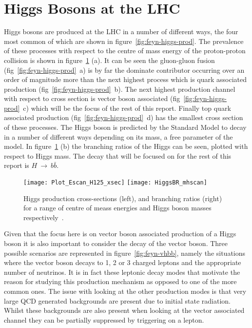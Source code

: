 \section{Higgs Bosons at the LHC}
%
Higgs bosons are produced at the LHC in a number of different ways, the four
most common of which are shown in figure~\ref{fig:feyn-higgs-prod}.
 The prevalence of these processes with
respect to the centre of mass energy of the proton-proton collision is shown in
figure~\ref{fig:higgs-br} (a). It can be seen the gluon-gluon fusion
(fig~\ref{fig:feyn-higgs-prod}~a) is by far the dominate contributor occurring
over an order of magnitude more than the next highest process which is quark
associated production (fig~\ref{fig:feyn-higgs-prod}~b). The next highest
production channel with respect to cross section is vector boson associated
(fig~\ref{fig:feyn-higgs-prod}~c) which will be the focus of the rest of this
report. Finally top quark associated production
(fig~\ref{fig:feyn-higgs-prod}~d) has the smallest cross section of these
processes.  The Higgs boson is predicted by the Standard Model to decay in a
number of different ways depending on its mass, a free parameter of the model.
In figure~\ref{fig:higgs-br} (b) the branching ratios of the Higgs can be seen,
plotted with respect to Higgs mass. The decay that will be focused on for the
rest of this report is $H~\rightarrow~b\bar{b}$.
\begin{figure}[ht]
  \centering
  \texttt{[image: Plot\_Escan\_H125\_xsec]}%
  \texttt{[image: HiggsBR\_mhscan]}

  \caption{Higgs production cross-sections (left), and branching
    ratios (right) for a range of centre of meass energies and Higgs boson
    masses respectively~\cite{CERN-yellow-4}.}%
  \label{fig:higgs-br}
\end{figure}%
Given that the focus here is on vector boson associated production of a Higgs
boson it is also important to consider the decay of the vector boson. Three
possible scenarios are represented in figure~\ref{fig:feyn-vhbb}, namely the
situations where the vector boson decays to 1, 2 or 3 charged leptons and the
appropriate number of neutrinos.  It is in fact
these leptonic decay modes that motivate the reason for studying this production
mechanism as opposed to one of the more common ones. The issue with looking at
the other production modes is that very large QCD generated backgrounds are
present due to initial state radiation. Whilst these backgrounds are also
present when looking at the vector associated channel they can be partially
suppressed by triggering on a lepton.

